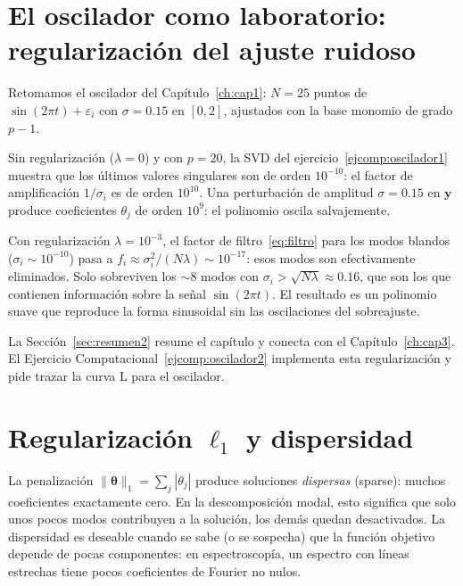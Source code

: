 \section{El oscilador como laboratorio: regularización del ajuste ruidoso}
\label{sec:oscilador2}


Retomamos el oscilador del Capítulo~\ref{ch:cap1}: $N = 25$ puntos de
$\sin(2\pi t) + \varepsilon_i$ con $\sigma = 0.15$ en $[0, 2]$,
ajustados con la base monomio de grado $p - 1$.

Sin regularización ($\lambda = 0$) y con $p = 20$, la SVD del
ejercicio~\ref{ejcomp:oscilador1} muestra que los últimos valores
singulares son de orden $10^{-10}$: el factor de amplificación
$1/\sigma_i$ es de orden $10^{10}$. Una perturbación de amplitud
$\sigma = 0.15$ en $\bm{y}$ produce coeficientes $\theta_j$ de
orden $10^9$: el polinomio oscila salvajemente.

Con regularización $\lambda = 10^{-3}$, el factor de
filtro~\eqref{eq:filtro} para los modos blandos ($\sigma_i \sim
10^{-10}$) pasa a $f_i \approx \sigma_i^2/(N\lambda) \sim 10^{-17}$:
esos modos son efectivamente eliminados. Solo sobreviven los $\sim 8$
modos con $\sigma_i > \sqrt{N\lambda} \approx 0.16$, que son los que
contienen información sobre la señal $\sin(2\pi t)$. El resultado es
un polinomio suave que reproduce la forma sinusoidal sin las
oscilaciones del sobreajuste.

La Sección~\ref{sec:resumen2} resume el capítulo y conecta con el
Capítulo~\ref{ch:cap3}. El Ejercicio
Computacional~\ref{ejcomp:oscilador2} implementa esta regularización
y pide trazar la curva L para el oscilador.

\section{Regularización $\ell_1$ y dispersidad}
\label{sec:lasso}


La penalización $\|\bm{\theta}\|_1 = \sum_j |\theta_j|$ produce
soluciones \emph{dispersas} (sparse): muchos coeficientes
exactamente cero. En la descomposición modal, esto significa que
solo unos pocos modos contribuyen a la solución, los demás quedan
desactivados. La dispersidad es deseable cuando se sabe (o se
sospecha) que la función objetivo depende de pocas componentes: en
espectroscopía, un espectro con líneas estrechas tiene pocos
coeficientes de Fourier no nulos.


